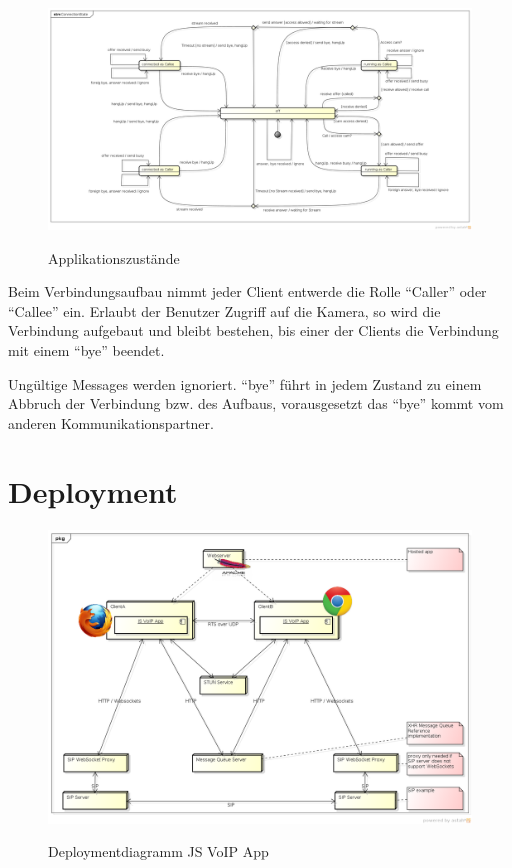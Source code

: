 	
	\begin{landscape}		
		\begin{figure}[H]
			\centering
			\includegraphics[height=0.7\textwidth]{../architekturanalayse/img/connectionState.png}
			\label{img:deployment}
			\caption{Applikationszustände}
		\end{figure}
		Beim Verbindungsaufbau nimmt jeder Client entwerde die Rolle "`Caller"' oder
		"`Callee"' ein. Erlaubt der Benutzer Zugriff auf die Kamera, so wird die
		Verbindung aufgebaut und bleibt bestehen, bis einer der Clients die Verbindung mit einem "`bye"' beendet.
		
		Ungültige Messages werden ignoriert. "`bye"' führt in jedem Zustand zu einem
		Abbruch der Verbindung bzw. des Aufbaus, vorausgesetzt das "`bye"'
		kommt vom anderen Kommunikationspartner.
	\end{landscape}
		
	
\clearpage
\section{Deployment}
	\begin{figure}[H]
		\centering
		\includegraphics[width=\textwidth]{../architekturanalayse/img/deployment.png}
		\label{img:deployment}
		\caption{Deploymentdiagramm JS VoIP App}
	\end{figure}
	